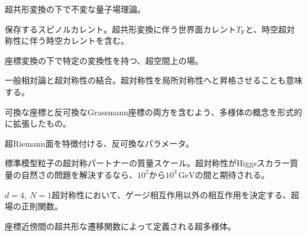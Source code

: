 {超共形変換の下で不変な量子場理論。}

{保存するスピノルカレント。超共形変換に伴う世界面カレント$T_{\mathrm F}$と、時空超対称性に伴う時空カレントを含む。}

{座標変換の下で特定の変換性を持つ、超空間上の場。}

{一般相対論と超対称性の結合。超対称性を局所対称性へと昇格させることも意味する。}

{可換な座標と反可換なGrassmann座標の両方を含むよう、多様体の概念を形式的に拡張したもの。}

{超Riemann面を特徴付ける、反可換なパラメータ。}

{標準模型粒子の超対称パートナーの質量スケール。超対称性がHiggsスカラー質量の自然さの問題を解決するなら、$10^2$から$10^3\,\mathrm{GeV}$の間と期待される。}

{$d=4,\ N=1$超対称性において、ゲージ相互作用以外の相互作用を決定する、超場の正則関数。}

{座標近傍間の超共形な遷移関数によって定義される超多様体。}
